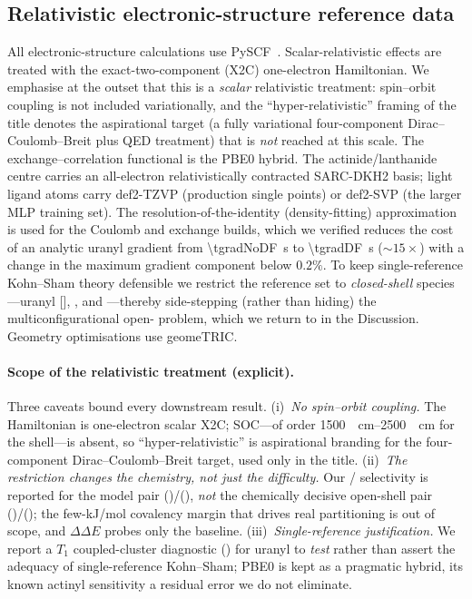 \documentclass[journal=jcisd8,manuscript=article]{achemso}
\begin{document}
\subsection{Relativistic electronic-structure reference data}
All electronic-structure calculations use PySCF~\cite{pyscf}. Scalar-relativistic
effects are treated with the exact-two-component (X2C) one-electron
Hamiltonian.\cite{Ilias2007} We emphasise at the outset that this is a
\emph{scalar} relativistic treatment: spin--orbit coupling is not included
variationally, and the ``hyper-relativistic'' framing of the title denotes the
aspirational target (a fully variational four-component Dirac--Coulomb--Breit plus
QED treatment\cite{Real2022}) that is \emph{not} reached at this scale. The
exchange--correlation functional is the PBE0 hybrid. The actinide/lanthanide centre
carries an all-electron relativistically contracted SARC-DKH2 basis;\cite{Pantazis}
light ligand atoms carry def2-TZVP (production single points) or def2-SVP (the
larger MLP training set). The resolution-of-the-identity (density-fitting)
approximation is used for the Coulomb and exchange builds, which we verified
reduces the cost of an analytic uranyl gradient from \SI{\tgradNoDF}{s} to
\SI{\tgradDF}{s} (\(\sim 15\times\)) with a change in the maximum gradient
component below \(0.2\%\). To keep single-reference Kohn--Sham theory defensible we
restrict the reference set to \emph{closed-shell}  species---uranyl
 [], ,  and ---thereby
side-stepping (rather than hiding) the multiconfigurational open- problem,
which we return to in the Discussion. Geometry optimisations use geomeTRIC.

\paragraph{Scope of the relativistic treatment (explicit).} Three caveats bound
every downstream result. (i)~\emph{No spin--orbit coupling.} The Hamiltonian is
one-electron scalar X2C; SOC---of order \SIrange{1500}{2500}{\per\cm} for the
 shell---is absent, so ``hyper-relativistic'' is aspirational branding for
the four-component Dirac--Coulomb--Breit target, used only in the title.
(ii)~\emph{The  restriction changes the chemistry, not just the
difficulty.} Our / selectivity is reported for the model
pair ()/(), \emph{not} the chemically decisive
open-shell pair ()/(); the few-\si{kJ/mol}
covalency margin that drives real partitioning is out of scope, and \(\Delta\Delta E\)
probes only the  baseline. (iii)~\emph{Single-reference justification.} We
report a \(T_1\) coupled-cluster diagnostic (\Tone) for uranyl to \emph{test} rather
than assert the adequacy of single-reference Kohn--Sham; PBE0 is kept as a pragmatic
hybrid, its known actinyl sensitivity a residual error we do not eliminate.
\end{document}
